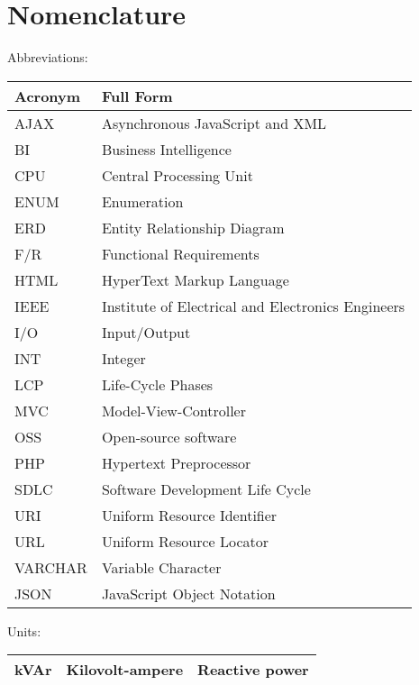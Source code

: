 

\cleardoublepage
{}
\chapter*{Nomenclature}

\begin{center}
Abbreviations:
\end{center}
\begin{table}[H]
\centering
\begin{small}
{\tabulinesep=1.4mm
\begin{tabu}{ | l | l | }
        \hline Acronym & Full Form \\ \hline
        AJAX & Asynchronous JavaScript and XML \\ \hline
        BI & Business Intelligence \\ \hline
        CPU & Central Processing Unit \\ \hline
        ENUM & Enumeration \\ \hline
        ERD & Entity Relationship Diagram \\ \hline
        F/R & Functional Requirements \\ \hline
        HTML & HyperText Markup Language \\ \hline
        IEEE & Institute of Electrical and Electronics Engineers \\ \hline
        I/O & Input/Output \\ \hline
        INT & Integer \\ \hline
        LCP & Life-Cycle Phases \\ \hline
        MVC & Model-View-Controller \\ \hline
        OSS & Open-source software \\ \hline
        PHP & Hypertext Preprocessor \\ \hline
        SDLC & Software Development Life Cycle \\ \hline
        URI & Uniform Resource Identifier \\ \hline
        URL & Uniform Resource Locator \\ \hline
        VARCHAR & Variable Character \\ \hline
        JSON & JavaScript Object Notation \\
        \hline
\end{tabu}}
\end{small}
\end{table}

\begin{center}
Units:
\end{center}
\begin{table}[H]
\centering
\begin{small}
{\tabulinesep=1.4mm
\begin{tabu}{| l | l | l |}
        \hline kVAr     & Kilovolt-ampere          & Reactive power\\
        \hline
\end{tabu}}
\end{small}
\end{table}
